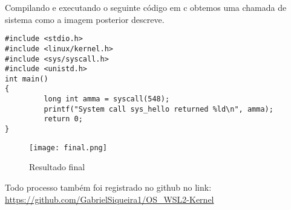 \documentclass[a4paper, 12pt]{article}
\begin{document}
Compilando e executando o seguinte código em c obtemos uma chamada de sistema como a imagem posterior descreve.

\begin{lstlisting} 
#include <stdio.h>
#include <linux/kernel.h>
#include <sys/syscall.h>
#include <unistd.h>
int main()
{
         long int amma = syscall(548);
         printf("System call sys_hello returned %ld\n", amma);
         return 0;
}
\end{lstlisting}

\begin{figure}[!h]
\centering 
\texttt{[image: final.png]}
\label{figura:qualquernome}
\caption{Resultado final}
\end{figure}

\newpage

Todo processo também foi registrado no github no link: \url{https://github.com/GabrielSiqueira1/OS_WSL2-Kernel}
\end{document}
